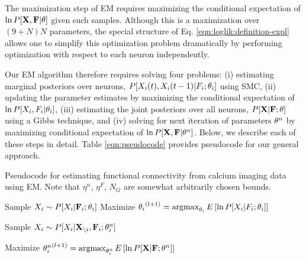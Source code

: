 The maximization step of EM requires maximizing the conditional expectation of $\ln P[{\bf X}, {\bf F} | \mathbf{\theta}]$ given such samples. Although this is a maximization over $(9+N)N$ parameters, the special structure of Eq. \eqref{eqn:loglik:definition-expl} allows one to simplify this optimization problem dramatically by performing optimization with respect to each neuron independently.  

Our EM algorithm therefore requires solving four problems: (i) estimating marginal posteriors over neurons, $P[X_i(t), X_i(t-1) | F_i; \mathbf{\theta}_i]$ using SMC, (ii) updating the parameter estimates by maximizing the conditional expectation of $\ln P[X_i, F_i | \mathbf{\theta}_i]$,  (iii) estimating the joint posteriors over all neurons,  $P[{\bf X}| {\bf F}; \mathbf{\theta}]$ using a Gibbs technique, and (iv) solving for next iteration of parameters $\mathbf{\theta}^n$ by maximizing conditional expectation of  $\ln P[{\bf X}, {\bf F}| \mathbf{\theta}^n]$.  Below, we describe each of these steps in detail. Table \ref{eqn:pseudocode} provides pseudocode for our general approach.  

\begin{algorithm}
\caption{Pseudocode for estimating functional connectivity from calcium imaging data using EM. Note that $\eta^n$, $\eta^F$, $N_G$ are somewhat arbitrarily chosen bounds.}
\label{eqn:pseudocode}
\begin{algorithmic}
      \State Sample $X_i \sim P[X_i|{\bf F}_i; \mathbf{\theta}_i]$
      \State Maximize ${\mathbf{\theta}_i}^{(l+1)}=\operatorname*{argmax}_{\mathbf{\theta}_i} E\left[\ln P[X_i | F_i; \mathbf{\theta}_i] \right]$
    \EndWhile
  \EndFor
  
      \State Sample $X_i \sim P[X_i|{\bf X}_{\backslash i},{\bf F}_i; \mathbf{\theta}^n_i]$
    \EndFor
  \EndFor 

  \State Maximize ${\mathbf{\theta}^n_i}^{(l+1)}=\operatorname*{argmax}_{\mathbf{\theta}^n_i} E\left[\ln P[{\bf X} | {\bf F}; \mathbf{\theta}^n]\right]$  
\EndWhile
\end{algorithmic}
\end{algorithm}
